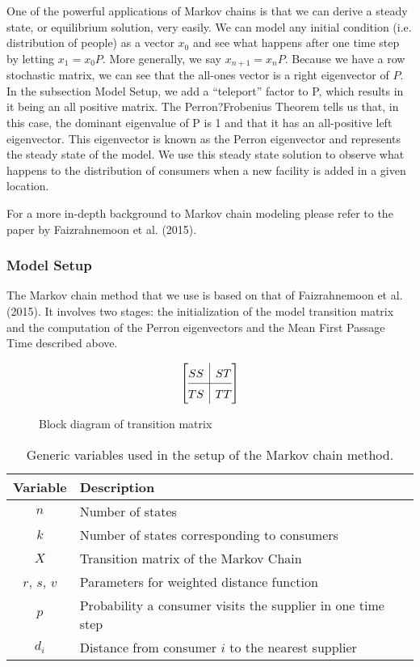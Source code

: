 \documentclass[twoside,twocolumn]{article}
\begin{document}
One of the powerful applications of Markov chains is that we can derive a steady state, or equilibrium solution, very easily.
We can model any initial condition (i.e. distribution of people) as a vector $x_0$ and see what happens after one time step by letting $x_1 = x_0 P$.
More generally, we say $x_{n + 1} = x_n P$.
Because we have a row stochastic matrix, we can see that the all-ones vector is a right eigenvector of $P$.
In the subsection Model Setup, we add a ``teleport'' factor to P, which results in it being an all positive matrix.
The Perron?Frobenius Theorem tells us that, in this case, the dominant eigenvalue of P is 1 and that it has an all-positive left eigenvector.
This eigenvector is known as the Perron eigenvector and represents the steady state of the model. %
We use this steady state solution to observe what happens to the distribution of consumers when a new facility is added in a given location.

For a more in-depth background to Markov chain modeling please refer to the paper by Faizrahnemoon et al. (2015).


\subsubsection{Model Setup}

The Markov chain method that we use is based on that of Faizrahnemoon et al. (2015).
It involves two stages: the initialization of the model transition matrix and the computation of the Perron eigenvectors and the Mean First Passage Time described above.
\begin{figure}
\[
\renewcommand{\arraystretch}{1.5} %
\left[\begin{array}{@{}c|c@{}}
  SS &
  ST
\\ \hline
  TS
  & TT
\end{array}\right]
\]
\caption{Block diagram of transition matrix}
\end{figure}

\begin{table}
\begin{tabular}{c | p{5cm}}
Variable & Description\\
\hline
$n$ & Number of states\\
$k$ & Number of states corresponding to consumers\\
$X$ & Transition matrix of the Markov Chain\\
$r$, $s$, $v$ & Parameters for weighted distance function\\
$p$ & Probability a consumer visits the supplier in one time step\\
$d_{i}$ & Distance from consumer $i$ to the nearest supplier\\
\end{tabular}
\caption{Generic variables used in the setup of the Markov chain method.}
\end{table}
\end{document}
